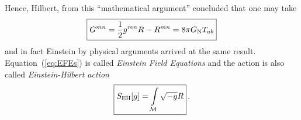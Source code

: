 \begin{itemize}
        Hence, Hilbert, from this ``mathematical argument'' concluded that
        one may take
        \begin{equation}
            \boxed{%
            G^{mn} = \frac{1}{2} g^{mn} R - R^{mn} = 8 \pi G_\text{N} T_{ab}
        }
        \label{eq:EFEs}
        \end{equation}
        and in fact Einstein by physical arguments arrived at the same result.
        Equation~(\ref{eq:EFEs}) is called \textit{Einstein Field Equations} and the action is
        also called \textit{Einstein-Hilbert action}
        \begin{equation}
            \boxed{%
                S_\text{EH}[g] = \int\limits_\M \sqrt{-g} R
            }\,.
        \end{equation}
\end{itemize}

